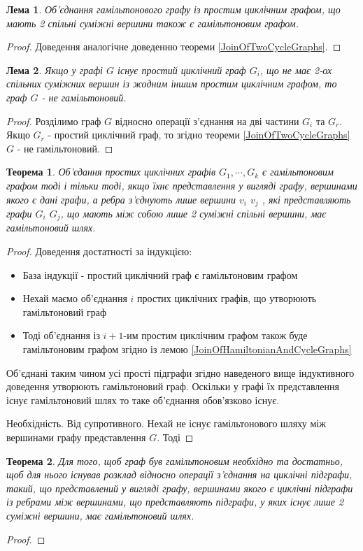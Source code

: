 \documentclass[a4paper,14pt,ukrainian]{extarticle}
\newtheorem{theorem}{Теорема}
\newtheorem{lemma}{Лема}
\begin{document}
    \begin{lemma}
        Об’єднання гамільтонового графу із простим циклічним графом, що мають 2 спільні суміжні вершини також є гамільтоновим графом.
    \end{lemma}
    \label{JoinOfHamiltonianAndCycleGraphs}
    \begin{proof}
        Доведення аналогічне доведенню теореми \ref{JoinOfTwoCycleGraphs}.
    \end{proof}
    \begin{lemma}
        Якщо у графі $G$ існує простий циклічний граф $G_i$, що не має 2-ох спільних суміжних вершин із жодним іншим простим циклічним графом, то граф $G$ - не гамільтоновий.
    \end{lemma}
    \begin{proof}
        Розділимо граф $G$ відносно операції з’єднання на дві частини $G_i$ та $G_r$.
        Якщо $G_r$ - простий циклічний граф, то згідно теореми \ref{JoinOfTwoCycleGraphs} $G$ - не гамільтоновий.
    \end{proof}
    \begin{theorem}
        Об’єдання простих циклічних графів $G_1, \cdots , G_k$ є гамільтоновим графом тоді і тільки тоді, якщо їхнє представлення у вигляді графу, вершинами якого є дані графи, а ребра з’єднують лише вершини $v_i$ $v_j$ , які представляють графи $G_i$ $G_j$, що мають між собою лише 2 суміжні спільні вершини, має гамільтоновий шлях.
    \end{theorem}
    \begin{proof}
        Доведення достатності за індукцією:
        \begin{itemize}
            \item База індукції - простий циклічний граф є гамільтоновим графом
            \item Нехай маємо об’єднання $i$ простих циклічних графів, що утворюють гамільтоновий граф
            \item Тоді об’єднання із $i+1$-им простим циклічним графом також буде гамільтоновим графом згідно із лемою \ref{JoinOfHamiltonianAndCycleGraphs}
        \end{itemize}
        Об’єднані таким чином усі прості підграфи згідно наведеного вище індуктивного доведення утворюють гамільтоновий граф.
        Оскільки у графі їх представлення існує гамільтоновий шлях то таке об’єднання обов’язково існує.
        
        Необхідність.
        Від супротивного.
        Нехай не існує гамільтонового шляху між вершинами графу представлення $G$.
        Тоді 
    \end{proof}
    \begin{theorem}
        Для того, щоб граф був гамільтоновим необхідно та достатньо, щоб для нього існував розклад відносно операції з’єднання на циклічні підграфи, такий, що представлений у вигляді графу, вершинами якого є циклічні підграфи із ребрами між вершинами, що представляють підграфи, у яких існує лише 2 суміжні вершини, має гамільтоновий шлях.
    \end{theorem}
    \begin{proof}
    \end{proof}
\end{document}
